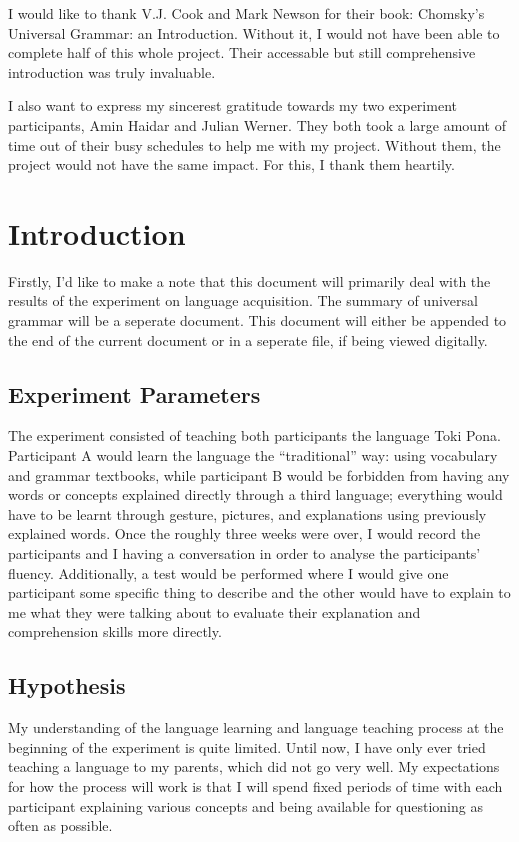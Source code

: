\documentclass[a4paper,10pt]{article}
\begin{document}
I would like to thank V.J. Cook and Mark Newson for their book: Chomsky's
Universal Grammar: an Introduction. Without it, I would not have been able to complete half of this
whole project. Their accessable but still comprehensive introduction was truly invaluable.

I also want to express my sincerest gratitude towards my two experiment participants, Amin Haidar
and Julian Werner. They both took a large amount of time out of their busy schedules to help me with
my project. Without them, the project would not have the same impact. For this, I thank them heartily.


\section{Introduction}
Firstly, I'd like to make a note that this document will primarily deal with the results of the
experiment on language acquisition. The summary of universal grammar will be a seperate document.
This document will either be appended to the end of the current document or in a seperate file, if
being viewed digitally.

\subsection{Experiment Parameters}
The experiment consisted of teaching both participants the language Toki Pona. Participant A would
learn the language the ``traditional'' way: using vocabulary and grammar textbooks, while participant
B would be forbidden from having any words or concepts explained directly through a third language;
everything would have to be learnt through gesture, pictures, and explanations using previously
explained words. Once the roughly three weeks were over, I would record the participants and I having
a conversation in order to analyse the participants' fluency. Additionally, a test would be performed
where I would give one participant some specific thing to describe and the other would have to explain
to me what they were talking about to evaluate their explanation and comprehension skills more directly.


\subsection{Hypothesis}
My understanding of the language learning and language teaching process at the beginning of the
experiment is quite limited. Until now, I have only ever tried teaching a language to my
parents, which did not go very well. My expectations for how the process will work is that
I will spend fixed periods of time with each participant explaining various concepts and being
available for questioning as often as possible.
\end{document}

